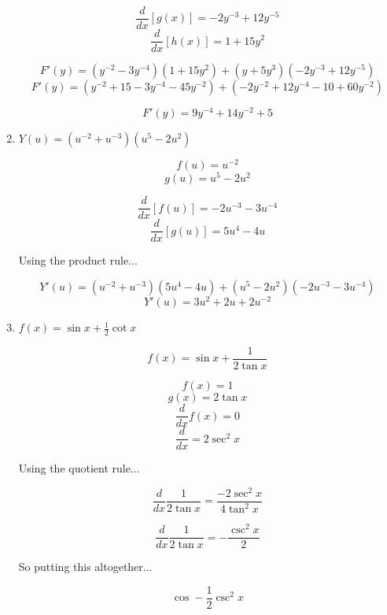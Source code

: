 \documentclass{article}
\begin{document}
\begin{enumerate}
			$$\frac{d}{dx} [g(x)] = -2y^{-3} + 12y^{-5}$$
			$$\frac{d}{dx} [h(x)] = 1 + 15y^2$$

			$$F'(y) = (y^{-2} - 3y^{-4})(1 + 15y^2) + (y + 5y^{3})(-2y^{-3} + 12y^{-5})$$
			$$F'(y) = (y^{-2} + 15 - 3y^{-4} - 45y^{-2}) + (-2y^{-2} + 12y^{-4} - 10 + 60y^{-2})$$

			$$F'(y) = 9y^{-4} + 14y^{-2} + 5$$

		\item $Y(u) = (u^{-2} + u^{-3})(u^{5}-2u^{2})$

			$$f(u) = u^{-2}$$
			$$g(u) = u^{5} - 2u^{2}$$

			$$\frac{d}{dx} [f(u)] = -2u^{-3} - 3u^{-4}$$
			$$\frac{d}{dx} [g(u)] = 5u^4 - 4u$$

			Using the product rule...

			$$Y'(u) = (u^{-2} + u^{-3})(5u^{4} - 4u) + (u^5 - 2u^2)(-2u^{-3} - 3u^{-4})$$
			$$Y'(u) = 3u^2 + 2u + 2u^{-2}$$

		\item $f(x) = \sin x + \frac{1}{2} \cot x$

			$$f(x) = \sin x + \frac{1}{2\tan x}$$
			
			$$f(x) = 1$$
			$$g(x) = 2\tan x$$
			$$\frac{d}{dx} f(x) = 0$$
			$$\frac{d}{dx} = 2\sec ^{2} x$$

			Using the quotient rule...

			$$\frac{d}{dx} \frac{1}{2\tan x} = \frac{- 2\sec ^{2} x}{4 \tan ^{2} x}$$

			$$\frac{d}{dx} \frac{1}{2\tan x} = - \frac{\csc ^{2} x}{2}$$

			So putting this altogether...

			$$\cos - \frac{1}{2} \csc ^{2} x$$
	\end{enumerate}
\end{document}
